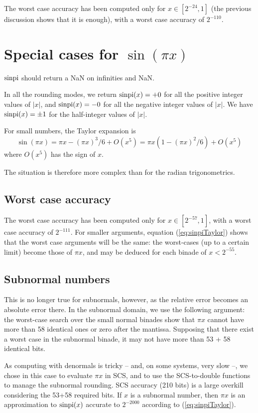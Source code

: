 The worst case accuracy has been computed only for $x \in [2^{-24},
1]$ (the previous discussion shows that it is enough), with a worst
case accuracy of $2^{-110}$.



\section{Special cases for $\sin(\pi x)$}
$\operatorname{sinpi}$ should return a NaN on infinities and NaN.

In all the rounding modes, we return $\operatorname{sinpi}(x)=+0$ for all the positive
integer values of $|x|$, and $\operatorname{sinpi}(x)=-0$ for all the negative integer
values of $|x|$. We have $\operatorname{sinpi}(x)=\pm 1$ for  the half-integer
values of $|x|$. 

For small numbers, the Taylor expansion is
\begin{equation}
  \sin(\pi x) = \pi x - (\pi x)^3/6 + O(x^5) = \pi x(1-(\pi
  x)^2/6) + O(x^5)\label{eq:sinpiTaylor}
\end{equation}
  where $O(x^5)$ has the sign of $x$. 

The situation is therefore more complex than for the radian
trigonometrics.

\subsection{Worst case accuracy}

The worst case accuracy has been computed only for $x \in [2^{-57},
1]$, with a worst case accuracy of $2^{-111}$. For smaller arguments,
equation (\ref{eq:sinpiTaylor}) shows that the worst case arguments
will be the same: the worst-cases (up to a certain limit) become those
of $\pi x$, and may be deduced for each binade of $x<2^{-55}$.

\subsection{Subnormal numbers}
This is no longer true for subnormals, however, as the relative error
becomes an absolute error there. In the subnormal domain, we use the
following argument: the worst-case search over the small normal
binades show that $\pi x$ cannot have more than 58 identical ones or
zero after the mantissa.  Supposing that there exist a worst case in
the subnormal binade, it may not have more than 53 + 58 identical
bits.

As computing with denormals is tricky -- and, on some systems, very
slow --, we chose in this case to evaluate $\pi x$ in SCS, and to use
the SCS-to-double functions to manage the subnormal rounding. SCS
accuracy (210 bits) is a large overkill considering the 53+58 required
bits. If $x$ is a subnormal number, then $\pi x$ is an approximation to
$\operatorname{sinpi}(x)$ accurate to $2^{-2000}$ according to
(\ref{eq:sinpiTaylor}). 



